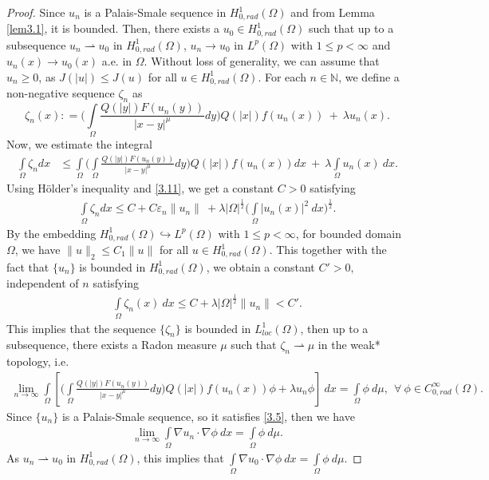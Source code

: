 \documentclass[11pt]{amsart}
\numberwithin{equation}{section}
\newcommand{\hr}{H^1_{0, rad}(\Omega)}
\newcommand{\1}{\frac{1}{2}}
\begin{document}
	\begin{proof}
		Since $u_n$ is a Palais-Smale sequence in $\hr$ and from Lemma \ref{lem3.1}, it is bounded. Then, there exists a $u_0\in \hr$ such that up to a subsequence $u_n\rightharpoonup u_0$ in $\hr$, $u_n \to u_0$ in $L^p(\Omega)$ with $1\leq p <\infty$ and $u_n(x)\to u_0(x)$ a.e. in $\Omega$. Without loss of generality, we can assume that $u_n \geq 0$, as $J(|u|) \leq J(u)$ for all $u\in \hr$. 
		For each $n\in \mathbb{N}$, we define a non-negative sequence $\zeta_n$ as
		\begin{equation*}
			\zeta_n(x): = \Bigg( \int\limits_\Omega \frac{Q(|y|)F(u_n(y))}{|x-y|^\mu}dy\Bigg) Q(|x|)f(u_n(x)) \ + \ \lambda u_n(x).
		\end{equation*}
		Now, we estimate the integral  
		\begin{align}
			\int\limits_{\Omega} \zeta_n dx 
			& \leq \int\limits_{\Omega} \Bigg( \int\limits_\Omega \frac{Q(|y|)F(u_n(y))}{|x-y|^\mu}dy\Bigg) Q(|x|)f(u_n(x)) dx \ + \ \lambda\int\limits_{\Omega} u_n(x) \ dx.\nonumber
		\end{align}
		Using H\"older's inequality and \eqref{3.11}, we get a constant $C>0$ satisfying
		\begin{align}
			\int\limits_{\Omega} \zeta_n dx \leq
			C + C \varepsilon_n \|u_n\| \ + \lambda |\Omega|^{\1} \Big( \int\limits_{\Omega} |u_n(x)|^2 \ dx\Big)^{\1}.\nonumber
		\end{align}
		By the embedding $\hr \hookrightarrow L^p(\Omega)$ with $1\leq p < \infty$, for bounded domain $\Omega$, we have $\|u\|_2 \leq C_1 \|u\|$ for all $u\in \hr$. This together with the fact that $\{u_n\}$ is bounded in $\hr$, we obtain a constant $C'>0$, independent of $n$ satisfying 
		\begin{align}
			\int\limits_{\Omega} \zeta_n(x) \ dx \leq C+ \lambda |\Omega|^{\1} \|u_n\| < C'. \nonumber
		\end{align}
		This implies that the sequence $\{\zeta_n\}$ is bounded in $L^1_{loc}(\Omega)$, then up to a subsequence, there exists a Radon measure $\mu$ such that $\zeta_n \rightharpoonup \mu$ in the weak* topology, i.e. 
		\begin{align*}
			\lim_{n\to \infty} \int\limits_\Omega \left[\Bigg( \int\limits_\Omega \frac{Q(|y|)F(u_n(y))}{|x-y|^\mu}dy\Bigg) Q(|x|)f(u_n(x)) \phi + \lambda u_n \phi \right] \ dx= \int\limits_\Omega \phi \ d\mu, \ \ \forall \ \phi \in C_{0,rad}^\infty(\Omega).
		\end{align*}
		Since $\{u_n\}$ is a Palais-Smale sequence, so it satisfies \eqref{3.5}, then we have
		\begin{align*}
			\lim_{n\to \infty} \int\limits_\Omega \nabla u_n \cdot \nabla \phi \ dx  =\int\limits_\Omega \phi \ d\mu.
		\end{align*}
		As $u_n \rightharpoonup u_0$ in $\hr$, this implies that
		$\displaystyle\int\limits_\Omega \nabla u_0 \cdot \nabla \phi \ dx =\int\limits_\Omega \phi \ d\mu.$
		

\end{proof}
\end{document}
